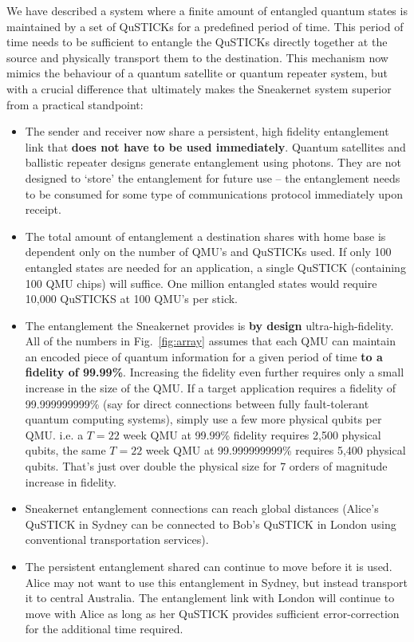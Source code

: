 \documentclass[twocolumn, aps, rmp, amsmath, amssymb, nofootinbib, superscriptaddress, longbibliography, floatfix, table-of-contents, eqsecnum]{revtex4-2}
\begin{document}
We have described a system where a finite amount of entangled quantum states is maintained by a set of QuSTICKs for a predefined period of time. This period of time needs to be sufficient to entangle the QuSTICKs directly together at the source and physically transport them to the destination. This mechanism now mimics the behaviour of a quantum satellite or quantum repeater system, but with a crucial difference that ultimately makes the Sneakernet system superior from a practical standpoint:
\begin{itemize}
\item The sender and receiver now share a persistent, high fidelity entanglement link that \textbf{does not have to be used immediately}. Quantum satellites and ballistic repeater designs generate entanglement using photons. They are not designed to `store' the entanglement for future use -- the entanglement needs to be consumed for some type of communications protocol immediately upon receipt.
\item The total amount of entanglement a destination shares with home base is dependent only on the number of QMU's and QuSTICKs used. If only 100 entangled states are needed for an application, a single QuSTICK (containing 100 QMU chips) will suffice. One million entangled states would require 10,000 QuSTICKS at 100 QMU's per stick. 
\item The entanglement the Sneakernet provides is \textbf{by design} ultra-high-fidelity. All of the numbers in Fig.~\ref{fig:array} assumes that each QMU can maintain an encoded piece of quantum information for a given period of time \textbf{to a fidelity of 99.99\%}. Increasing the fidelity even further requires only a small increase in the size of the QMU. If a target application requires a fidelity of 99.999999999\% (say for direct connections between fully fault-tolerant quantum computing systems), simply use a few more physical qubits per QMU. i.e. a $T= 22$ week QMU at 99.99\% fidelity requires 2,500 physical qubits, the same $T=22$ week QMU at 99.999999999\% requires 5,400 physical qubits. That's just over double the physical size for 7 orders of magnitude increase in fidelity.
\item Sneakernet entanglement connections can reach global distances (Alice's QuSTICK in Sydney can be connected to Bob's QuSTICK in London using conventional transportation services).
\item The persistent entanglement shared can continue to move before it is used. Alice may not want to use this entanglement in Sydney, but instead transport it to central Australia. The entanglement link with London will continue to move with Alice as long as her QuSTICK provides sufficient error-correction for the additional time required.
\end{itemize}
\end{document}
